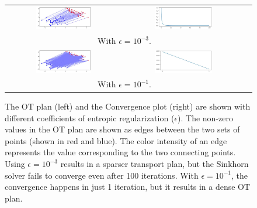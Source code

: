 \begin{figure}[ht]
    \centering
    \begin{tabular}{ccc}
        \includegraphics[width=0.5\textwidth]{chapter-2/images/0.001.jpg} & 
        \includegraphics[width=0.5\textwidth]{chapter-2/images/err_0.001.jpg}\\
        \multicolumn{2}{c}{With $\epsilon=10^{-3}$.}\\[0.2cm]
        \includegraphics[width=0.5\textwidth]{chapter-2/images/0.1.jpg} & 
        \includegraphics[width=0.5\textwidth]{chapter-2/images/err_0.1.jpg}\\
        \multicolumn{2}{c}{With $\epsilon=10^{-1}$.}\\
    \end{tabular}
    \caption[Illustration of the trade-off of the level of the sparsity of the OT plan and the numerical stability of the Sinkhorn algorithm for solving the entropy-regularized OT formulation.]{The OT plan (left) and the Convergence plot (right) are shown with different coefficients of entropic regularization ($\epsilon$). The non-zero values in the OT plan are shown as edges between the two sets of points (shown in red and blue). The color intensity of an edge represents the value corresponding to the two connecting points. Using $\epsilon=10^{-3}$ results in a sparser transport plan, but the Sinkhorn solver fails to converge even after 100 iterations. With $\epsilon=10^{-1}$, the convergence happens in just 1 iteration, but it results in a dense OT plan.}\label{fig:entr-sparsity}
\end{figure}